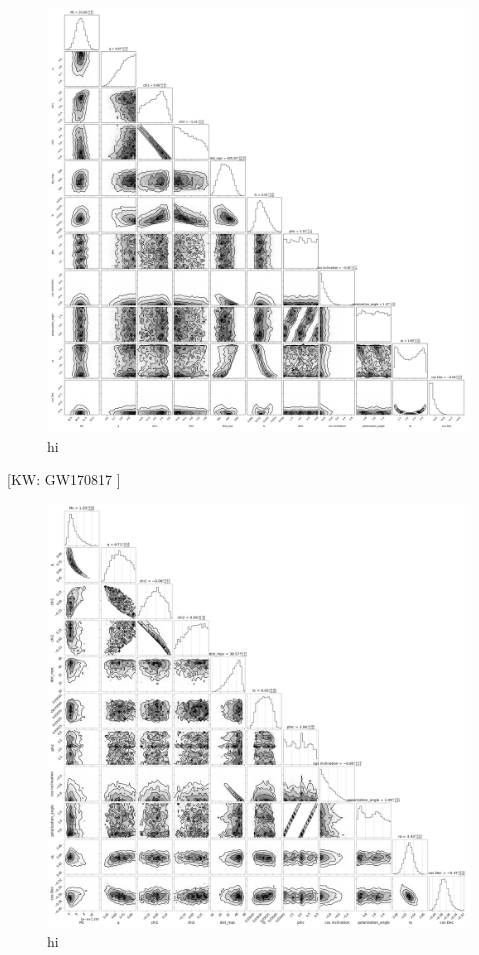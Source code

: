 \documentclass[twocolumn]{aastex631}
\newcommand{\kw}[1]{{\color{rb4}[KW: #1 ]}}
\begin{document}
\begin{figure}
\includegraphics[width=0.99\linewidth]{static/GW150914.png}
\caption{
    hi
}
\label{fig:GW150914}
\end{figure}

\kw{GW170817}

\begin{figure}
\includegraphics[width=0.99\linewidth]{static/GW170817.png}
\caption{
    hi
}
\label{fig:GW170817}
\end{figure}
\end{document}
